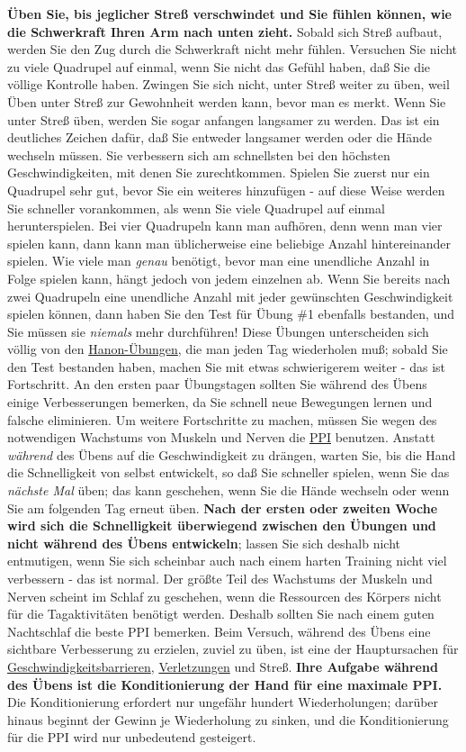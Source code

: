 \textbf{Üben Sie, bis jeglicher Streß verschwindet und Sie fühlen können, wie die Schwerkraft Ihren Arm nach unten zieht.}
Sobald sich Streß aufbaut, werden Sie den Zug durch die Schwerkraft nicht mehr fühlen.
Versuchen Sie nicht zu viele Quadrupel auf einmal, wenn Sie nicht das Gefühl haben, daß Sie die völlige Kontrolle haben.
Zwingen Sie sich nicht, unter Streß weiter zu üben, weil Üben unter Streß zur Gewohnheit werden kann, bevor man es merkt.
Wenn Sie unter Streß üben, werden Sie sogar anfangen langsamer zu werden.
Das ist ein deutliches Zeichen dafür, daß Sie entweder langsamer werden oder die Hände wechseln müssen.
Sie verbessern sich am schnellsten bei den höchsten Geschwindigkeiten, mit denen Sie zurechtkommen.
Spielen Sie zuerst nur ein Quadrupel sehr gut, bevor Sie ein weiteres hinzufügen - auf diese Weise werden Sie schneller vorankommen, als wenn Sie viele Quadrupel auf einmal herunterspielen.
Bei vier Quadrupeln kann man aufhören, denn wenn man vier spielen kann, dann kann man üblicherweise eine beliebige Anzahl hintereinander spielen.
Wie viele man \textit{genau} benötigt, bevor man eine unendliche Anzahl in Folge spielen kann, hängt jedoch von jedem einzelnen ab.
Wenn Sie bereits nach zwei Quadrupeln eine unendliche Anzahl mit jeder gewünschten Geschwindigkeit spielen können, dann haben Sie den Test für Übung \#1 ebenfalls bestanden, und Sie müssen sie \textit{niemals} mehr durchführen!
Diese Übungen unterscheiden sich völlig von den \hyperref[c1iii7h]{Hanon-Übungen}, die man jeden Tag wiederholen muß; sobald Sie den Test bestanden haben, machen Sie mit etwas schwierigerem weiter - das ist Fortschritt.
An den ersten paar Übungstagen sollten Sie während des Übens einige Verbesserungen bemerken, da Sie schnell neue Bewegungen lernen und falsche eliminieren.
Um weitere Fortschritte zu machen, müssen Sie wegen des notwendigen Wachstums von Muskeln und Nerven die \hyperref[c1ii15]{PPI} benutzen.
Anstatt \textit{während} des Übens auf die Geschwindigkeit zu drängen, warten Sie, bis die Hand die Schnelligkeit von selbst entwickelt, so daß Sie schneller spielen, wenn Sie das \textit{nächste Mal} üben; das kann geschehen, wenn Sie die Hände wechseln oder wenn Sie am folgenden Tag erneut üben.
\textbf{Nach der ersten oder zweiten Woche wird sich die Schnelligkeit überwiegend zwischen den Übungen und nicht während des Übens entwickeln}; lassen Sie sich deshalb nicht entmutigen, wenn Sie sich scheinbar auch nach einem harten Training nicht viel verbessern - das ist normal.
Der größte Teil des Wachstums der Muskeln und Nerven scheint im Schlaf zu geschehen, wenn die Ressourcen des Körpers nicht für die Tagaktivitäten benötigt werden.
Deshalb sollten Sie nach einem guten Nachtschlaf die beste PPI bemerken.
Beim Versuch, während des Übens eine sichtbare Verbesserung zu erzielen, zuviel zu üben, ist eine der Hauptursachen für \hyperref[c1iv2b]{Geschwindigkeitsbarrieren}, \hyperref[c1iii10hand]{Verletzungen} und Streß.
\textbf{Ihre Aufgabe während des Übens ist die Konditionierung der Hand für eine maximale PPI.}
Die Konditionierung erfordert nur ungefähr hundert Wiederholungen; darüber hinaus beginnt der Gewinn je Wiederholung zu sinken, und die Konditionierung für die PPI wird nur unbedeutend gesteigert.

